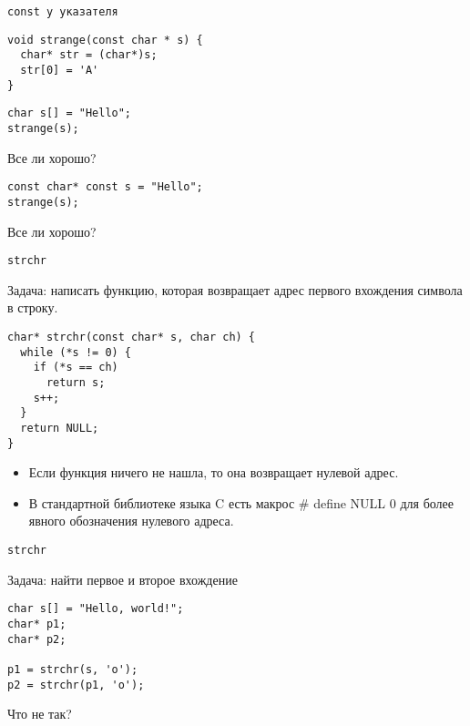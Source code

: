 \documentclass[pdf, 10pt, unicode]{beamer}
\begin{document}
\begin{frame}[fragile]{{\tt const у указателя}}
\begin{verbatim}
void strange(const char * s) {
  char* str = (char*)s;
  str[0] = 'A'
}
\end{verbatim}

\begin{verbatim}
char s[] = "Hello";
strange(s);
\end{verbatim}
Все ли хорошо?

\begin{verbatim}
const char* const s = "Hello";
strange(s);
\end{verbatim}
Все ли хорошо?

\end{frame}

\begin{frame}[fragile]{{\tt strchr}}

Задача: написать функцию, которая возвращает адрес первого вхождения символа в строку.

\begin{lstlisting}
char* strchr(const char* s, char ch) {
  while (*s != 0) {
    if (*s == ch)
      return s;
    s++;
  }
  return NULL;
}
\end{lstlisting}

\begin{itemize}
  \item Если функция ничего не нашла, то она возвращает нулевой адрес.
  \item В стандартной библиотеке языка C есть макрос \# define NULL 0 для более явного обозначения нулевого адреса.
\end{itemize}

\end{frame}

\begin{frame}[fragile]{{\tt strchr}}

Задача: найти первое и второе вхождение

\begin{lstlisting}
char s[] = "Hello, world!";
char* p1;
char* p2;

p1 = strchr(s, 'o');
p2 = strchr(p1, 'o');

\end{lstlisting}

Что не так?
\begin{enumerate}
\end{enumerate}

\end{frame}
\end{document}
